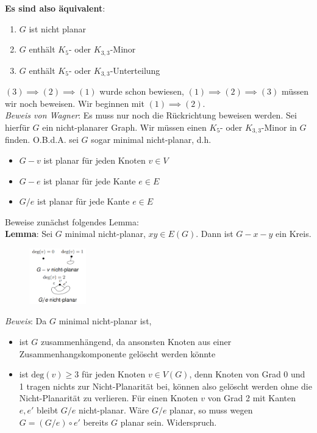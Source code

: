 \textbf{Es sind also äquivalent}:
\begin{enumerate}
	\item $G$ ist nicht planar
	\item $G$ enthält $K_5$- oder $K_{3,3}$-Minor
	\item $G$ enthält $K_5$- oder $K_{3,3}$-Unterteilung
\end{enumerate}

$(3)\implies(2)\implies(1)$ wurde schon bewiesen, $(1)\implies(2)\implies(3)$ müssen wir noch beweisen. Wir beginnen mit $(1)\implies(2)$.\\

\textit{Beweis von Wagner}: Es muss nur noch die Rückrichtung beweisen werden. Sei hierfür $G$ ein nicht-planarer Graph. Wir müssen einen $K_5$- oder $K_{3,3}$-Minor in $G$ finden. O.B.d.A. sei $G$ sogar minimal nicht-planar, d.h.
\begin{itemize}
	\item $G-v$ ist planar für jeden Knoten $v\in V$
	\item $G-e$ ist planar für jede Kante $e\in E$
	\item $G/e$ ist planar für jede Kante $e\in E$
\end{itemize}

Beweise zunächst folgendes Lemma:\\

\textbf{Lemma}: Sei $G$ minimal nicht-planar, $xy\in E(G)$. Dann ist $G-x-y$ ein Kreis.

\begin{figure}
	\centering
	\vspace{30pt}
	\includegraphics[width=0.22\textwidth]{images/wagner-1.png}
	\vspace{40pt}
	\vspace{-80pt}
\end{figure}
\textit{Beweis}: Da $G$ minimal nicht-planar ist,
\begin{itemize}
	\item ist $G$ zusammenhängend, da ansonsten Knoten aus einer Zusammenhangskomponente gelöscht werden könnte
	\item ist $\text{deg}(v)\geq 3$ für jeden Knoten $v\in V(G)$, denn Knoten von Grad 0 und 1 tragen nichts zur Nicht-Planarität bei, können also gelöscht werden ohne die Nicht-Planarität zu verlieren. Für einen Knoten $v$ von Grad 2 mit Kanten $e, e'$ bleibt $G/e$ nicht-planar. Wäre $G/e$ planar, so muss wegen $G = (G/e) \circ e'$ bereits $G$ planar sein. Widerspruch.
\end{itemize}

